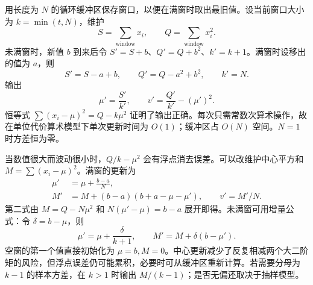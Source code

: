 用长度为 $N$ 的循环缓冲区保存窗口，以便在满窗时取出最旧值。设当前窗口大小为 $k=\min(t,N)$，维护
\[
 S=\sum_{\text{window}}x_i,\qquad Q=\sum_{\text{window}}x_i^2.
\]
未满窗时，新值 $b$ 到来后令 $S'=S+b$、$Q'=Q+b^2$、$k'=k+1$。满窗时设移出的值为 $a$，则
\[
 S'=S-a+b,\qquad Q'=Q-a^2+b^2,
 \qquad k'=N.
\]
输出
\[
 \mu'=\frac{S'}{k'},\qquad
 v'=\frac{Q'}{k'}-(\mu')^2.
\]
恒等式 $\sum(x_i-\mu)^2=Q-k\mu^2$ 证明了输出正确。每次只需常数次算术操作，故在单位代价算术模型下单次更新时间为 $O(1)$；缓冲区占 $O(N)$ 空间。$N=1$ 时方差恒为零。

当数值很大而波动很小时，$Q/k-\mu^2$ 会有浮点消去误差。可以改维护中心平方和 $M=\sum(x_i-\mu)^2$。满窗的更新为
\[
 \begin{aligned}
 \mu'&=\mu+\frac{b-a}{N},\\
 M'&=M+(b-a)(b+a-\mu-\mu'),\qquad v'=M'/N.
 \end{aligned}
\]
第二式由 $M=Q-N\mu^2$ 和 $N(\mu'-\mu)=b-a$ 展开即得。未满窗可用增量公式：令 $\delta=b-\mu$，则
\[
 \mu'=\mu+\frac{\delta}{k+1},\qquad
 M'=M+\delta(b-\mu').
\]
空窗的第一个值直接初始化为 $\mu=b,M=0$。中心更新减少了反复相减两个大二阶矩的风险，但浮点误差仍可能累积，必要时可从缓冲区重新计算。若需要分母为 $k-1$ 的样本方差，在 $k>1$ 时输出 $M/(k-1)$；是否无偏还取决于抽样模型。
